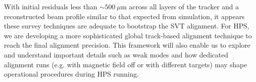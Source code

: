 
With initial residuals less than $\sim 500~\mu$m across all layers of 
the tracker and a reconstructed beam profile similar to that expected from simulation, it appears these survey techniques 
are adequate to bootstrap the SVT alignment. 
For HPS, we are developing a more sophisticated global track-based alignment technique to reach 
the final alignment precision. This framework will also enable us to explore and understand important details 
such as weak modes and how dedicated alignment runs 
(e.g. with magnetic field off or with different targets) may shape operational procedures during HPS running.
